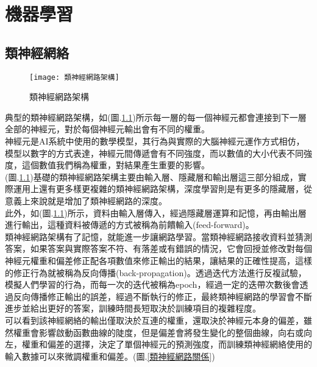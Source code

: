 \chapter{機器學習}
\section{類神經網絡}
\begin{figure}[hbt!]
\begin{center}
\texttt{[image: 類神經網路架構]}
\caption{\Large 類神經網路架構}\label{類神經網路架構}
\end{center}
\end{figure}

 典型的類神經網路架構，如(圖.\ref{類神經網路架構})所示每一層的每一個神經元都會連接到下一層全部的神經元，對於每個神經元輸出會有不同的權重。\\

 神經元是AI系統中使用的數學模型，其行為與實際的大腦神經元運作方式相仿，模型以數字的方式表達，神經元間傳遞會有不同強度，而以數值的大小代表不同強度，這個數值我們稱為權重，對結果產生重要的影響。\\

 (圖.\ref{類神經網路架構})基礎的類神經網路架構主要由輸入層、隱藏層和輸出層這三部分組成，實際運用上還有更多樣更複雜的類神經網路架構，深度學習則是有更多的隱藏層，從意義上來說就是增加了類神經網路的深度。\\

 此外，如(圖.\ref{類神經網路架構})所示，資料由輸入層傳入，經過隱藏層運算和記憶，再由輸出層進行輸出，這種資料被傳遞的方式被稱為前饋輸入(feed-forward)。\\

 類神經網路架構有了記憶，就能進一步讓網路學習。當類神經網路接收資料並猜測答案，如果答案與實際答案不符、有落差或有錯誤的情況，它會回授並修改對每個神經元權重和偏差修正配各項數值來修正輸出的結果，讓結果的正確性提高，這樣的修正行為就被稱為反向傳播(back-propagation)。透過迭代方法進行反複試驗，模擬人們學習的行為，而每一次的迭代被稱為epoch，經過一定的迭帶次數後會透過反向傳播修正輸出的誤差，經過不斷執行的修正，最終類神經網路的學習會不斷進步並給出更好的答案，訓練時間長短取決於訓練項目的複雜程度。\\

 可以看到該神經網絡的輸出僅取決於互連的權重，還取決於神經元本身的偏差，雖然權重會影響啟動函數曲線的陡度，但是偏差會將發生變化的整個曲線，向右或向左，權重和偏差的選擇，決定了單個神經元的預測強度，而訓練類神經網絡使用的輸入數據可以來微調權重和偏差。(圖.\ref{類神經網路關係})\\

